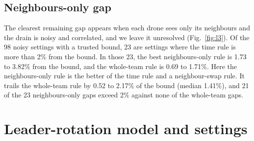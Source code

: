 \documentclass[11pt]{article}
\begin{document}
\subsection{Neighbours-only gap}

The clearest remaining gap appears when each drone sees only its neighbours and the drain is noisy and correlated, and we leave it unresolved (Fig.~\ref{fig:l3}).
Of the 98 noisy settings with a trusted bound, 23 are settings where the time rule is more than 2\% from the bound.
In those 23, the best neighbours-only rule is 1.73 to 3.82\% from the bound, and the whole-team rule is 0.69 to 1.71\%.
Here the neighbours-only rule is the better of the time rule and a neighbour-swap rule.
It trails the whole-team rule by 0.52 to 2.17\% of the bound (median 1.41\%), and 21 of the 23 neighbours-only gaps exceed 2\% against none of the whole-team gaps.

\section{Leader-rotation model and settings}
\label{app:model}
\end{document}
